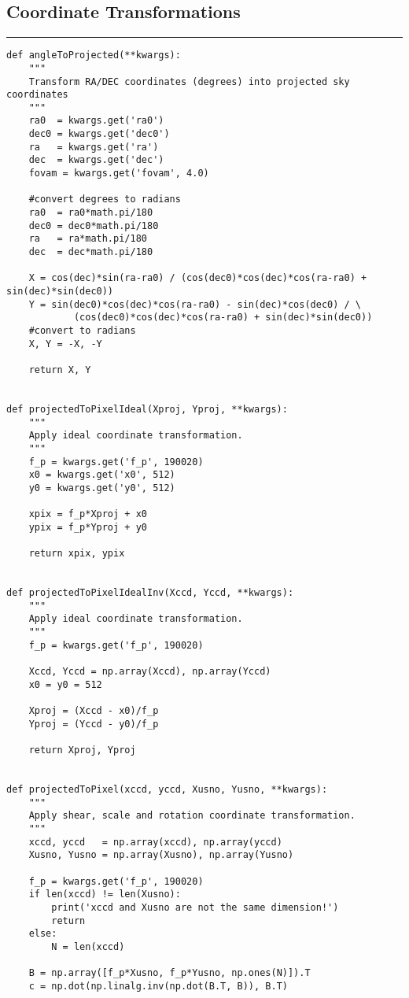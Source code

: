 \documentclass[preprint]{aastex62}
\begin{document}
\subsection{Coordinate Transformations} \label{code:coordinates}
\hrule
\begin{lstlisting}
def angleToProjected(**kwargs):
    """
    Transform RA/DEC coordinates (degrees) into projected sky coordinates
    """
    ra0  = kwargs.get('ra0')
    dec0 = kwargs.get('dec0')
    ra   = kwargs.get('ra')
    dec  = kwargs.get('dec')
    fovam = kwargs.get('fovam', 4.0)

    #convert degrees to radians
    ra0  = ra0*math.pi/180
    dec0 = dec0*math.pi/180
    ra   = ra*math.pi/180
    dec  = dec*math.pi/180

    X = cos(dec)*sin(ra-ra0) / (cos(dec0)*cos(dec)*cos(ra-ra0) + sin(dec)*sin(dec0))
    Y = sin(dec0)*cos(dec)*cos(ra-ra0) - sin(dec)*cos(dec0) / \
            (cos(dec0)*cos(dec)*cos(ra-ra0) + sin(dec)*sin(dec0))
    #convert to radians
    X, Y = -X, -Y

    return X, Y


def projectedToPixelIdeal(Xproj, Yproj, **kwargs):
    """
    Apply ideal coordinate transformation.
    """
    f_p = kwargs.get('f_p', 190020)
    x0 = kwargs.get('x0', 512)
    y0 = kwargs.get('y0', 512)
    
    xpix = f_p*Xproj + x0
    ypix = f_p*Yproj + y0
    
    return xpix, ypix


def projectedToPixelIdealInv(Xccd, Yccd, **kwargs):
    """
    Apply ideal coordinate transformation.
    """
    f_p = kwargs.get('f_p', 190020)
    
    Xccd, Yccd = np.array(Xccd), np.array(Yccd)
    x0 = y0 = 512
    
    Xproj = (Xccd - x0)/f_p
    Yproj = (Yccd - y0)/f_p

    return Xproj, Yproj


def projectedToPixel(xccd, yccd, Xusno, Yusno, **kwargs):
    """
    Apply shear, scale and rotation coordinate transformation.
    """
    xccd, yccd   = np.array(xccd), np.array(yccd)
    Xusno, Yusno = np.array(Xusno), np.array(Yusno)

    f_p = kwargs.get('f_p', 190020)
    if len(xccd) != len(Xusno):
        print('xccd and Xusno are not the same dimension!')
        return
    else:
        N = len(xccd)

    B = np.array([f_p*Xusno, f_p*Yusno, np.ones(N)]).T
    c = np.dot(np.linalg.inv(np.dot(B.T, B)), B.T)


\end{lstlisting}
\end{document}
